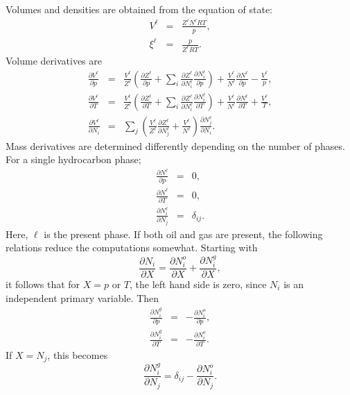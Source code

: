 Volumes and densities are obtained from the equation of state:
\begin{eqnarray}
  V^\ell & = & \frac{Z^\ell N^\ell RT}{p}, \\
  \xi^\ell & = & \frac{p}{Z^\ell RT}.
\end{eqnarray}
Volume derivatives are
\begin{eqnarray}
  \frac{\partial V^\ell}{\partial p} & = &
  \frac{V^\ell}{Z^\ell} \left(
    \frac{\partial Z^\ell}{\partial p} +
    \sum_i
    \frac{\partial Z^\ell}{\partial N_i^\ell}
    \frac{\partial N_i^\ell}{\partial p}
  \right) +
  \frac{V^\ell}{N^\ell} \frac{\partial N^\ell}{\partial p} -
  \frac{V^\ell}{p}, \\
  \frac{\partial V^\ell}{\partial T} & = &
  \frac{V^\ell}{Z^\ell} \left(
    \frac{\partial Z^\ell}{\partial T} +
    \sum_i
    \frac{\partial Z^\ell}{\partial N_i^\ell}
    \frac{\partial N_i^\ell}{\partial T}
  \right) +
  \frac{V^\ell}{N^\ell} \frac{\partial N^\ell}{\partial T} +
  \frac{V^\ell}{T}, \\
  \frac{\partial V^\ell}{\partial N_i} & = &
  \sum_j \left(
    \frac{V^\ell}{Z^\ell}
    \frac{\partial Z^\ell}{\partial N_j^\ell} +
    \frac{V^\ell}{N^\ell}
  \right) \frac{\partial N_j^\ell}{\partial N_i}.
\end{eqnarray}
Mass derivatives are determined differently depending on the number of
phases. For a single hydrocarbon phase;
\begin{eqnarray}
  \frac{\partial N^\ell}{\partial p} & = & 0, \\
  \frac{\partial N^\ell}{\partial T} & = & 0, \\
  \frac{\partial N_i^\ell}{\partial N_j} & = & \delta_{ij}.
\end{eqnarray}
Here, $\ell$ is the present phase. If both oil and gas are present,
the following relations reduce the computations somewhat. Starting
with
\begin{equation}
  \frac{\partial N_i}{\partial X} =
  \frac{\partial N_i^o}{\partial X} +
  \frac{\partial N_i^g}{\partial X},
\end{equation}
it follows that for $X=p$ or $T$, the left hand side is zero, since
$N_i$ is an independent primary variable. Then
\begin{eqnarray}
  \frac{\partial N_i^g}{\partial p} & = &
  -\frac{\partial N_i^o}{\partial p}, \\
  \frac{\partial N_i^g}{\partial T} & = &
  -\frac{\partial N_i^o}{\partial T}.
\end{eqnarray}
If $X=N_j$, this becomes
\begin{equation}
  \frac{\partial N_i^g}{\partial N_j} =
  \delta_{ij} - \frac{\partial N_i^o}{\partial N_j}.
\end{equation}

